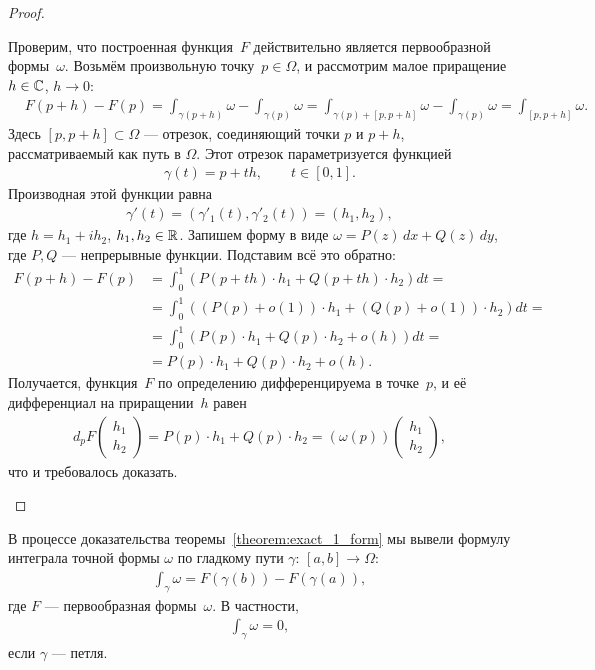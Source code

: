\documentclass[../complex-analysis.tex]{subfiles}
\begin{document}
\begin{proof}
\begin{itemize}
   Проверим, что построенная функция~$F$ действительно является первообразной формы~$ \omega $. Возьмём произвольную точку~$p \in \Omega$, и рассмотрим малое приращение $h \in \mathbb{C}$, $h \to 0$:
   \begin{align*}
    &F(p + h) - F(p) = \int_{\gamma(p + h)}  \omega - \int_{\gamma(p)}  \omega = \int_{\gamma(p) + [p,p+h]} \omega - \int_{\gamma(p)}   \omega = \int_{[p,p+h]} \omega.
   \end{align*} Здесь $[p,p+h] \subset \Omega$ --- отрезок, соединяющий точки $p$ и $p + h$, рассматриваемый как путь в $\Omega$. Этот отрезок параметризуется функцией
   \begin{align*}
    \gamma(t) = p + th, \qquad t \in [0,1].
   \end{align*} Производная этой функции равна
   \begin{align*}
    \gamma'(t) = (\gamma'_1(t), \gamma'_2(t)) = (h_1, h_2),
   \end{align*} где $h = h_1 + i h_2$, $ h_1,h_2\in\mathbb{R} $. Запишем форму в виде $\omega = P(z)\,dx + Q(z)\,dy$, где $P,Q$ --- непрерывные функции. Подставим всё это обратно:
   \begin{align*}
    F(p+h)-F(p) &= \int_{0}^{1} \left( P(p+th) \cdot h_1 + Q(p+th)\cdot h_2 \right)dt = \\
    &=  \int_{0}^{1} \left( (P(p) + o(1))\cdot h_1 + (Q(p) + o(1))\cdot h_2 \right)dt = \\
    &= \int_{0}^{1} \left( P(p) \cdot h_1 + Q(p)\cdot h_2 + o(h) \right)dt = \\
    &= P(p) \cdot h_1 + Q(p)\cdot h_2 + o(h).
   \end{align*} Получается, функция~$F$ по определению дифференцируема в точке~$p$, и её дифференциал на приращении~$h$ равен
   \begin{align*}
    d_p F \begin{pmatrix}
     h_1 \\ h_2
     \end{pmatrix} = P(p)\cdot  h_1 + Q(p)\cdot h_2 = \left( \omega(p) \right) \begin{pmatrix}
     h_1 \\ h_2
    \end{pmatrix}
   ,\end{align*} что и требовалось доказать.
 \end{itemize}
\end{proof}

\begin{remrk}
 В процессе доказательства теоремы~\ref{theorem:exact_1_form} мы вывели формулу интеграла точной формы $ \omega $ по гладкому пути $ \gamma \colon\,[a,b] \to \Omega $:
 \begin{align*}
  \int_{\gamma} \omega =  F(\gamma(b)) - F(\gamma(a)),
 \end{align*} где $ F $ --- первообразная формы~$ \omega $. В частности,
 \begin{align*}
  \int_{\gamma} \omega = 0, 
 \end{align*} если $ \gamma $ --- петля.
\end{remrk}
\end{document}
